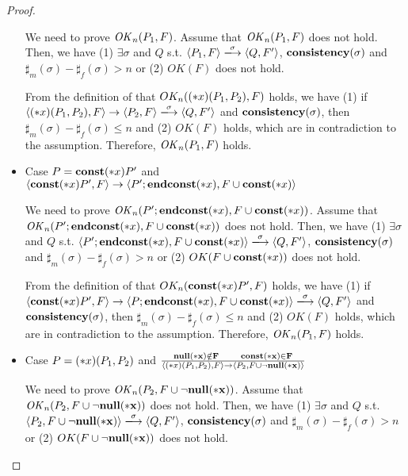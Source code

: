 \begin{proof}
\begin{itemize}
  We need to prove \(\mathit{OK}_n(P_1, F)\).  Assume that \(\mathit{OK}_n(P_1, F)\)
  does not hold. Then, we have (1) \( \exists \sigma \) and \(Q\)
  s.t. \( \langle P_1, F \rangle \xlongrightarrow{\sigma} \langle Q,
  F' \rangle \), \(\mathbf{consistency}(\sigma)\) and \(\sharp_{m}(\sigma) -
  \sharp_{f}(\sigma) > n\) or (2) \( OK(F)\) does not hold.

  From the definition of that \(OK_n((*x)(P_1, P_2), F)\) holds, we
  have (1) if \( \langle \Sirx(P_1, P_2), F \rangle \rightarrow
  \langle P_2, F \rangle \xlongrightarrow{\sigma} \langle Q, F'
  \rangle \) and \(\mathbf{consistency}(\sigma)\), then \(\sharp_m(\sigma) -
  \sharp_f(\sigma) \le n \) and (2) \(OK(F)\) holds, which are in
  contradiction to the assumption.  Therefore, \(\mathit{OK}_n(P_1, F)\)
  holds.

\item Case \( P = \mathbf{const}(*x) P' \) and \( \langle \mathbf{const}(*x) P', F \rangle
  \rightarrow \langle P';\mathbf{endconst}(*x), F\cup{\mathbf{const}(*x)} \rangle  \)

  We need to prove \(\mathit{OK}_n(P';\mathbf{endconst}(*x), F\cup{\mathbf{const}(*x)})\).  Assume
  that \(\mathit{OK}_n(P';\mathbf{endconst}(*x), F\cup{\mathbf{const}(*x)})\) does not hold. Then,
  we have (1) \( \exists \sigma \) and \(Q\) s.t. \( \langle
  P';\Endconst, F\cup{\scon\Sirx} \rangle \xlongrightarrow{\sigma}
  \langle Q, F' \rangle \), \(\mathbf{consistency}(\sigma)\) and \(\sharp_{m}(\sigma) -
  \sharp_{f}(\sigma) > n\) or (2) \( OK(F\cup{\mathbf{const}(*x)})\) does not
  hold.

  From the definition of that \(OK_n(\mathbf{const}(*x) P', F)\) holds, we
  have (1) if \( \langle \scon\Sirx P', F \rangle \rightarrow \langle
  P;\Endconst, F\cup{\scon\Sirx} \rangle \xlongrightarrow{\sigma}
  \langle Q, F' \rangle \) and \(\mathbf{consistency}(\sigma)\), then \(\sharp_m(\sigma) -
  \sharp_f(\sigma) \le n \) and (2) \(OK(F)\) holds, which are in
  contradiction to the assumption.  Therefore, \(\mathit{OK}_n(P_1, F)\)
  holds.

\item Case \( P = (*x)(P_1,P_2) \) and \( \frac{ \bf{null}(*x) \notin F
  \quad\quad \mathbf{const}(*x) \in F} { \langle (*x)(P_1, P_2), F \rangle
  \rightarrow \langle P_2, F\cup{\neg\bf{null}(*x)} \rangle } \)

  We need to prove \(\mathit{OK}_n(P_2, F\cup{\neg\bf{null}(*x)})\).  Assume that
  \(\mathit{OK}_n(P_2, F\cup{\neg\bf{null}(*x)})\) does not hold. Then, we have (1) \(
  \exists \sigma \) and \(Q\) s.t. \( \langle P_2, F\cup{\snnull}
  \rangle \xlongrightarrow{\sigma} \langle Q, F' \rangle \), \(\mathbf{consistency}(\sigma)\) and
  \(\sharp_{m}(\sigma) - \sharp_{f}(\sigma) > n\) or (2) \(
  OK(F\cup{\neg\bf{null}(*x)})\) does not hold.


\end{itemize}
\end{proof}
